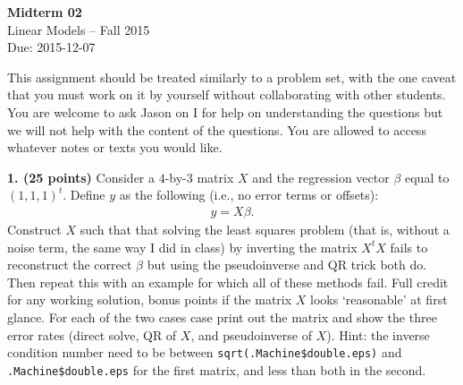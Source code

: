 \documentclass[12pt]{article}
\begin{document}
\begin{center}
{\bf Midterm 02} \\
Linear Models -- Fall 2015 \\
Due: 2015-12-07
\end{center}

\medskip

This assignment should be treated similarly to a problem set, with the one
caveat that you must work on it by yourself without collaborating with other
students. You are welcome to ask Jason on I for help on understanding the
questions but we will not help with the content of the questions. You are allowed
to access whatever notes or texts you would like.

{\bf 1. (25 points)} Consider a $4$-by-$3$ matrix $X$ and the
regression vector $\beta$ equal to $(1, 1, 1)^t$. Define $y$ as the following (i.e., no
error terms or offsets):
\begin{align*}
y = X \beta.
\end{align*}
Construct $X$ such that that solving the least squares
problem (that is, without a noise term, the same way I did in class) by inverting
the matrix $X^t X$ fails to reconstruct the correct $\beta$ but using the pseudoinverse
and QR trick both do. Then repeat this with an example for which all of these methods fail.
Full credit for any working solution, bonus points if the matrix $X$ looks
`reasonable' at first glance. For each of the two cases case print out the matrix and show
the three error rates (direct solve, QR of $X$, and pseudoinverse of $X$). Hint: the inverse
condition number need to be between \texttt{sqrt(.Machine\$double.eps)} and
\texttt{.Machine\$double.eps} for the first matrix, and less than both in the second.

\end{document}
